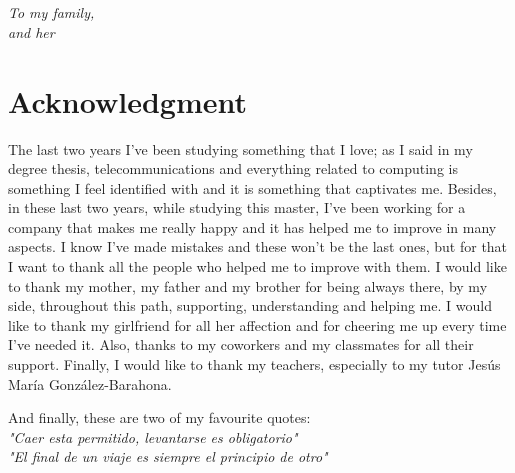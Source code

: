 \documentclass[a4paper, 12pt]{book}
\begin{document}
\newpage
\mbox{}
\thispagestyle{empty} %



\chapter*{}
\begin{flushright}
\textit{To my family, \\
and her
}
\end{flushright}


\chapter*{Acknowledgment}
The last two years I’ve been studying something that I love; as I said in my degree thesis, telecommunications and everything related to computing is something I feel identified with and it is something that captivates me. Besides, in these last two years, while studying this master, I’ve been working for a company that makes me really happy and it has helped me to improve in many aspects. I know I’ve made mistakes and these won’t be the last ones, but for that I want to thank all the people who helped me to improve with them. I would like to thank my mother, my father and my brother for being always there, by my side, throughout this path, supporting, understanding and helping me. I would like to thank my girlfriend for all her affection and for cheering me up every time I've needed it. Also, thanks to my coworkers and my classmates for all their support. Finally, I would like to thank my teachers, especially to my tutor Jesús María González-Barahona.


And finally, these are two of my favourite quotes:\\ 

\textit{"Caer esta permitido, levantarse es obligatorio"}\\
\textit{"El final de un viaje es siempre el principio de otro"}


\end{document}
